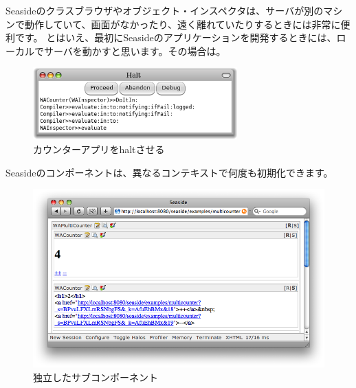 \documentclass[a4paper,10pt,twoside]{book}
\begin{document}
Seasideのクラスブラウザやオブジェクト・インスペクタは、サーバが別のマシンで動作していて、画面がなかったり、遠く離れていたりするときには非常に便利です。
とはいえ、最初にSeasideのアプリケーションを開発するときには、ローカルでサーバを動かすと思います。その場合は。

\begin{figure}[ht]
\begin{center}
\includegraphics[width=0.7\textwidth]{haltingCounter}
\caption{カウンターアプリをhaltさせる}
\end{center}
\end{figure}


Seasideのコンポーネントは、異なるコンテキストで何度も初期化できます。

\begin{figure}[ht]
\begin{center}
\includegraphics[width=\textwidth]{multiCounterHalos}
\caption{独立したサブコンポーネント}
\end{center}
\end{figure}
\end{document}
